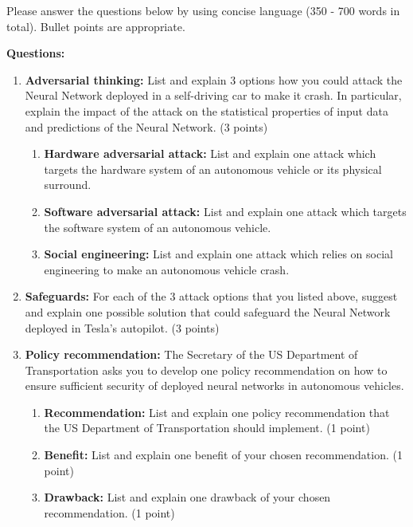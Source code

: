 \documentclass[submit]{harvardml}
\begin{document}
\begin{problem}
Please answer the questions below by using concise language (350 - 700
words in total). Bullet points are appropriate.

\textbf{Questions: }

\begin{enumerate}
\item
  \textbf{Adversarial thinking: }List and explain 3 options how you
  could attack the Neural Network deployed in a self-driving car to make
  it crash. In particular, explain the impact of the attack on the
  statistical properties of input data and predictions of the Neural
  Network. (3 points)

  \begin{enumerate}
  \item
    \textbf{Hardware adversarial attack: }List and explain one attack
    which targets the hardware system of an autonomous vehicle or its
    physical surround.
  \item
    \textbf{Software adversarial attack:} List and explain one attack
    which targets the software system of an autonomous vehicle.
  \item
    \textbf{Social engineering:} List and explain one attack which
    relies on social engineering to make an autonomous vehicle crash.
  \end{enumerate}

\item
  \textbf{Safeguards: }For each of the 3 attack options that you listed
  above, suggest and explain one possible solution that could safeguard
  the Neural Network deployed in Tesla's autopilot. (3 points)

\item
  \textbf{Policy recommendation: }The Secretary of the US Department of
  Transportation asks you to develop one policy recommendation on how to
  ensure sufficient security of deployed neural networks in autonomous
  vehicles.

  \begin{enumerate}
  \item
    \textbf{Recommendation:} List and explain one policy recommendation
    that the US Department of Transportation should implement. (1 point)
  \item
    \textbf{Benefit: }List and explain one benefit of your chosen
    recommendation. (1 point)
  \item
    \textbf{Drawback: }List and explain one drawback of your chosen
    recommendation. (1 point)
  \end{enumerate}
\end{enumerate}

\end{problem}
\end{document}
